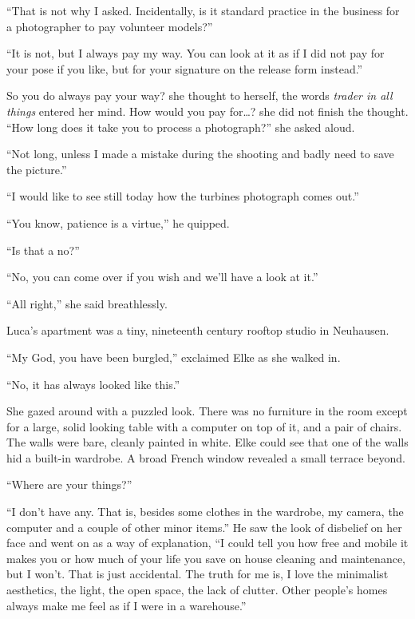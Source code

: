``That is not why I asked. Incidentally, is it standard practice in the business for a photographer to pay volunteer models?''

``It is not, but I always pay my way. You can look at it as if I did not pay for your pose if you like, but for your signature on the release form instead.''

So you do always pay your way? she thought to herself, the words \emph{trader in all things} entered her mind. How would you pay for\ldots? she did not finish the thought. ``How long does it take you to process a photograph?'' she asked aloud.

``Not long, unless I made a mistake during the shooting and badly need to save the picture.''

``I would like to see still today how the turbines photograph comes out.''

``You know, patience is a virtue,'' he quipped.

``Is that a no?''

``No, you can come over if you wish and we'll have a look at it.''

``All right,'' she said breathlessly.

\sectionline

Luca's apartment was a tiny, nineteenth century rooftop studio in Neuhausen.

``My God, you have been burgled,'' exclaimed Elke as she walked in.

``No, it has always looked like this.''

She gazed around with a puzzled look. There was no furniture in the room except for a large, solid looking table with a computer on top of it, and a pair of chairs. The walls were bare, cleanly painted in white. Elke could see that one of the walls hid a built-in wardrobe. A broad French window revealed a small terrace beyond.

``Where are your things?''

``I don't have any. That is, besides some clothes in the wardrobe, my camera, the computer and a couple of other minor items.'' He saw the look of disbelief on her face and went on as a way of explanation, ``I could tell you how free and mobile it makes you or how much of your life you save on house cleaning and maintenance, but I won't. That is just accidental. The truth for me is, I love the minimalist aesthetics, the light, the open space, the lack of clutter. Other people's homes always make me feel as if I were in a warehouse.''

